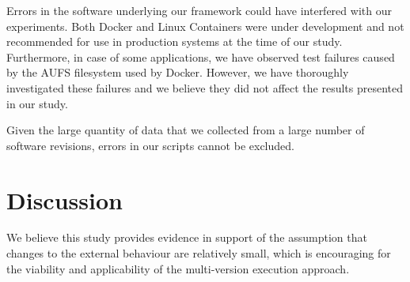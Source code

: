 Errors in the software underlying our framework could have interfered with
our experiments. Both Docker and Linux Containers were under development
and not recommended for use in production systems at the time of our study.
Furthermore, in case of some applications, we have observed test failures
caused by the AUFS filesystem used by Docker. However, we have thoroughly
investigated these failures and we believe they did not affect the results
presented in our study.

Given the large quantity of data that we collected from a large number
of software revisions, errors in our scripts cannot be excluded.

\section{Discussion}
\label{evolution:discussion}

We believe this study provides evidence in support of the assumption that
changes to the external behaviour are relatively small, which is encouraging
for the viability and applicability of the multi-version execution approach.
